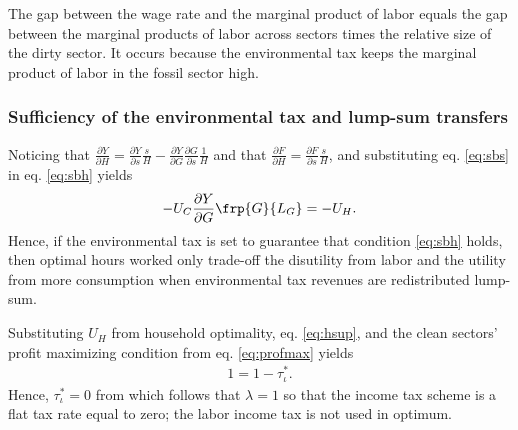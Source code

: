 The gap between the wage rate and the marginal product of labor equals the gap between the marginal products of labor across sectors times the relative size of the dirty sector. It occurs because the environmental tax keeps the marginal product of labor in the fossil sector high. 

\subsubsection{Sufficiency of the environmental tax and lump-sum transfers}\label{app:incometax0}

Noticing that $\frac{\partial Y}{\partial H}= \frac{\partial Y}{\partial s}\frac{s}{H}-\frac{\partial Y}{\partial G}\frac{\partial G}{\partial s}\frac{1}{H}$ and that $\frac{\partial F}{\partial H}=\frac{\partial F}{\partial s}\frac{s}{H}$, and substituting eq. \eqref{eq:sbs} in eq. \eqref{eq:sbh} yields
\begin{align}\label{eq:pigou}
-U_C \frac{\partial Y}{\partial G}\frp{G}{L_G}=-U_H.
\end{align}
Hence, if the environmental tax is set to guarantee that condition \eqref{eq:sbh} holds, then optimal hours worked only trade-off the disutility from labor and the utility from more consumption when environmental tax revenues are redistributed lump-sum.



Substituting $U_H$ from household optimality, eq. \eqref{eq:hsup}, and the clean sectors' profit maximizing condition from eq. \eqref{eq:profmax} yields
\begin{align}
1=1-\tau^*_\iota.\nonumber
\end{align}
Hence, $\tau^*_\iota =0$ from which follows that $\lambda =1$ so that the income tax scheme is a flat tax rate equal to zero; the labor income tax is not used in optimum.

%
